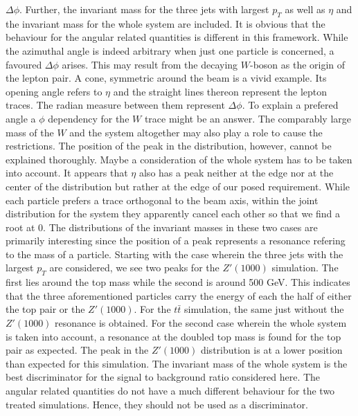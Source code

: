$\Delta \phi$. Further, the invariant mass for the three jets with largest $p_T$ as well as $\eta$ and the invariant mass for the whole system
are included. It is obvious that the behaviour for the angular related quantities is different in this framework. While the azimuthal angle is indeed
arbitrary when just one particle is concerned, a favoured $\Delta\phi$ arises. This may result from the decaying $W$-boson as the origin of the lepton
pair. A cone, symmetric around the beam is a vivid example. Its opening angle refers to $\eta$ and the straight lines thereon represent the lepton 
traces. The radian measure between them represent $\Delta \phi$. To explain a prefered angle a $\phi$ dependency for the $W$ trace might be an answer.
The comparably large mass of the $W$ and the system altogether may also play a role to cause the restrictions.
The position of the peak in the distribution, however, cannot be explained thoroughly. Maybe a consideration of the whole system has to be taken
into account. It appears that $\eta$ also has a peak neither at the edge nor at the center of the distribution but rather at the edge of our posed
requirement. While each particle prefers a trace orthogonal to the beam axis, within the joint distribution for the system they apparently cancel each other so that
we find a root at 0. The distributions of the invariant masses in these two cases are primarily interesting since the position of a peak represents
a resonance refering to the mass of a particle. Starting with the case wherein the three jets with the largest $p_T$ are considered, we see two peaks
for the $Z'(1000)$ simulation. The first lies around the top mass while the second is around 500 GeV. This indicates that the three aforementioned particles
carry the energy of each the half of either the top pair or the $Z'(1000)$. For the $t\bar t$ simulation, the same just without the $Z'(1000)$ resonance is 
obtained. For the second case wherein the whole system is taken into account, a resonance at the doubled top mass is found for the top pair 
as expected. The peak in the $Z'(1000)$ distribution is at a lower position than expected for this simulation. The invariant mass of the whole system
is the best discriminator for the signal to background ratio considered here. The angular related quantities do not have a much different behaviour 
for the two treated simulations. Hence, they should not be used as a discriminator. 

